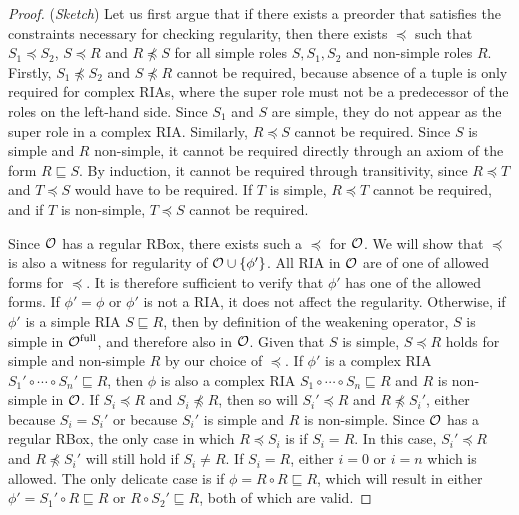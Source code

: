 \documentclass[
]{ceurart}
\begin{document}
\begin{proof}(\emph{Sketch}) \label{proof:regularity}
  Let us first argue that if there exists a preorder that satisfies the constraints necessary for checking regularity, then there exists $\preceq$ such that $S_1 \preceq S_2$, $S \preceq R$ and $R \not\preceq S$ for all simple roles $S, S_1, S_2$ and non-simple roles $R$. Firstly, $S_1 \not\preceq S_2$ and $S \not\preceq R$ cannot be required, because absence of a tuple is only required for complex RIAs, where the super role must not be a predecessor of the roles on the left-hand side. Since $S_1$ and $S$ are simple, they do not appear as the super role in a complex RIA. Similarly, $R \preceq S$ cannot be required. Since $S$ is simple and $R$ non-simple, it cannot be required directly through an axiom of the form $R \sqsubseteq S$. By induction, it cannot be required through transitivity, since $R \preceq T$ and $T \preceq S$ would have to be required. If $T$ is simple, $R \preceq T$ cannot be required, and if $T$ is non-simple, $T \preceq S$ cannot be required.

  Since $\mathcal{O}$ has a regular RBox, there exists such a $\preceq$ for $\mathcal{O}$. We will show that $\preceq$ is also a witness for regularity of $\mathcal{O} \cup \{ \phi' \}$. All RIA in $\mathcal{O}$ are of one of allowed forms for $\preceq$. It is therefore sufficient to verify that $\phi'$ has one of the allowed forms.
  If $\phi' = \phi$ or $\phi'$ is not a RIA, it does not affect the regularity.
  Otherwise, if $\phi'$ is a simple RIA $S \sqsubseteq R$, then by definition of the weakening operator, $S$ is simple in ${\mathcal{O}^\textnormal{full}}$, and therefore also in $\mathcal{O}$. Given that $S$ is simple, $S \preceq R$ holds for simple and non-simple $R$ by our choice of $\preceq$.
  If $\phi'$ is a complex RIA $S_1' \circ \cdots \circ S_n' \sqsubseteq R$, then $\phi$ is also a complex RIA $S_1 \circ \cdots \circ S_n \sqsubseteq R$ and $R$ is non-simple in $\mathcal{O}$. If $S_i \preceq R$ and $S_i \not\preceq R$, then so will $S_i' \preceq R$ and $R \not\preceq S_i'$, either because $S_i = S_i'$ or because $S_i'$ is simple and $R$ is non-simple. Since $\mathcal{O}$ has a regular RBox, the only case in which $R \preceq S_i$ is if $S_i = R$. In this case, $S_i' \preceq R$ and $R \not\preceq S_i'$ will still hold if $S_i \not= R$. If $S_i = R$, either $i = 0$ or $i = n$ which is allowed. The only delicate case is if $\phi = R \circ R \sqsubseteq R$, which will result in either $\phi' = S_1' \circ R \sqsubseteq R$ or $R \circ S_2' \sqsubseteq R$, both of which are valid.
\end{proof}
\end{document}
